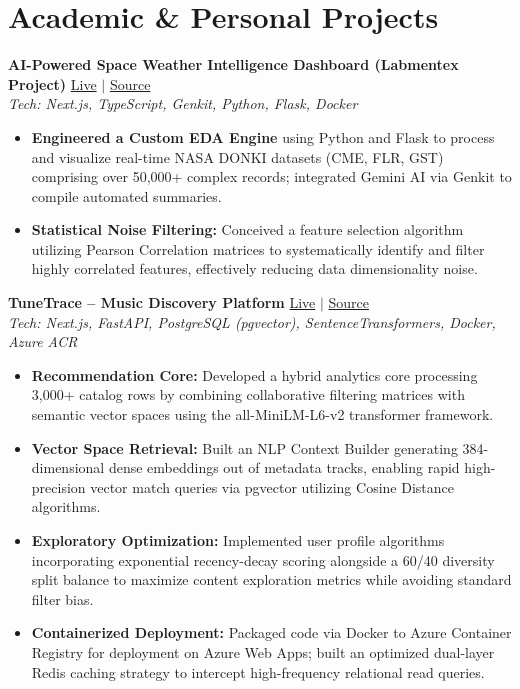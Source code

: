 \documentclass[10pt, a4paper]{article}
\begin{document}
\section*{Academic \& Personal Projects}
\noindent
\textbf{AI-Powered Space Weather Intelligence Dashboard (Labmentex Project)} \hfill \href{https://space-weather-insights.vercel.app/}{\faLink{} Live} $|$ \href{https://github.com/Agrannya-Singh/Space-Weather-Insights}{\faGithub{} Source} \\
\textit{Tech: Next.js, TypeScript, Genkit, Python, Flask, Docker}
\begin{itemize}
    \item \textbf{Engineered a Custom EDA Engine} using Python and Flask to process and visualize real-time NASA DONKI datasets (CME, FLR, GST) comprising over 50,000+ complex records; integrated Gemini AI via Genkit to compile automated summaries.
    \item \textbf{Statistical Noise Filtering:} Conceived a feature selection algorithm utilizing Pearson Correlation matrices to systematically identify and filter highly correlated features, effectively reducing data dimensionality noise.
\end{itemize}

\vspace{0.4ex}
\noindent
\textbf{TuneTrace -- Music Discovery Platform} \hfill \href{https://tune-trace-iota.vercel.app/app}{\faLink{} Live} $|$ \href{https://github.com/Agrannya-Singh/Tune_Trace_backend}{\faGithub{} Source} \\
\textit{Tech: Next.js, FastAPI, PostgreSQL (pgvector), SentenceTransformers, Docker, Azure ACR}
\begin{itemize}
    \item \textbf{Recommendation Core:} Developed a hybrid analytics core processing 3,000+ catalog rows by combining collaborative filtering matrices with semantic vector spaces using the all-MiniLM-L6-v2 transformer framework.
    \item \textbf{Vector Space Retrieval:} Built an NLP Context Builder generating 384-dimensional dense embeddings out of metadata tracks, enabling rapid high-precision vector match queries via pgvector utilizing Cosine Distance algorithms.
    \item \textbf{Exploratory Optimization:} Implemented user profile algorithms incorporating exponential recency-decay scoring alongside a 60/40 diversity split balance to maximize content exploration metrics while avoiding standard filter bias.
    \item \textbf{Containerized Deployment:} Packaged code via Docker to Azure Container Registry for deployment on Azure Web Apps; built an optimized dual-layer Redis caching strategy to intercept high-frequency relational read queries.
\end{itemize}
\end{document}

